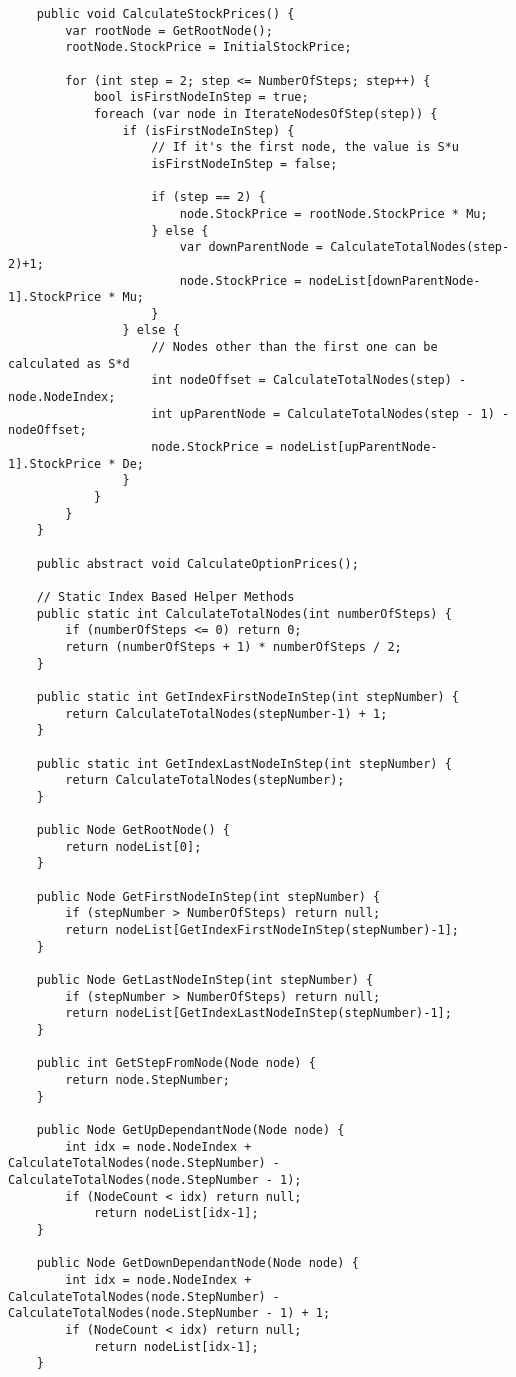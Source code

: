 \begin{lstlisting}
	public void CalculateStockPrices() {
		var rootNode = GetRootNode();
		rootNode.StockPrice = InitialStockPrice;

		for (int step = 2; step <= NumberOfSteps; step++) {
			bool isFirstNodeInStep = true;
			foreach (var node in IterateNodesOfStep(step)) {
				if (isFirstNodeInStep) {
					// If it's the first node, the value is S*u
					isFirstNodeInStep = false;

					if (step == 2) {
						node.StockPrice = rootNode.StockPrice * Mu;
					} else {
						var downParentNode = CalculateTotalNodes(step-2)+1;
						node.StockPrice = nodeList[downParentNode-1].StockPrice * Mu;
					}
				} else {
					// Nodes other than the first one can be calculated as S*d
					int nodeOffset = CalculateTotalNodes(step) - node.NodeIndex;
					int upParentNode = CalculateTotalNodes(step - 1) - nodeOffset;
					node.StockPrice = nodeList[upParentNode-1].StockPrice * De;
				}
			}
		}
	}
	
	public abstract void CalculateOptionPrices();
	
	// Static Index Based Helper Methods
	public static int CalculateTotalNodes(int numberOfSteps) {
		if (numberOfSteps <= 0) return 0;
		return (numberOfSteps + 1) * numberOfSteps / 2;
	}
	
	public static int GetIndexFirstNodeInStep(int stepNumber) {
		return CalculateTotalNodes(stepNumber-1) + 1;
	}
	
	public static int GetIndexLastNodeInStep(int stepNumber) {
		return CalculateTotalNodes(stepNumber);
	}
	
	public Node GetRootNode() {
		return nodeList[0];
	}
	
	public Node GetFirstNodeInStep(int stepNumber) {
		if (stepNumber > NumberOfSteps) return null;
		return nodeList[GetIndexFirstNodeInStep(stepNumber)-1];
	}
	
	public Node GetLastNodeInStep(int stepNumber) {
		if (stepNumber > NumberOfSteps) return null;
		return nodeList[GetIndexLastNodeInStep(stepNumber)-1];
	}
	
	public int GetStepFromNode(Node node) {
		return node.StepNumber;
	}
	
	public Node GetUpDependantNode(Node node) {
		int idx = node.NodeIndex + CalculateTotalNodes(node.StepNumber) - CalculateTotalNodes(node.StepNumber - 1);
		if (NodeCount < idx) return null;
			return nodeList[idx-1];
	}
	
	public Node GetDownDependantNode(Node node) {
		int idx = node.NodeIndex + CalculateTotalNodes(node.StepNumber) - CalculateTotalNodes(node.StepNumber - 1) + 1;
		if (NodeCount < idx) return null;
			return nodeList[idx-1];
	}
	

\end{lstlisting}
